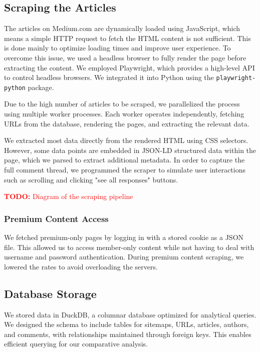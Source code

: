 \documentclass[11pt,a4paper]{article}
\newcommand{\todo}[1]{\textcolor{red}{\textbf{TODO:} #1}}
\newcommand{\code}[1]{\texttt{#1}}
\begin{document}
\subsection{Scraping the Articles}

The articles on Medium.com are dynamically loaded using JavaScript, which means a simple HTTP request to fetch the HTML content is not sufficient. This is done mainly to optimize loading times and improve user experience. To overcome this issue, we used a headless browser to fully render the page before extracting the content. We employed Playwright, which provides a high-level API to control headless browsers. We integrated it into Python using the \code{playwright-python} package.

Due to the high number of articles to be scraped, we parallelized the process using multiple worker processes. Each worker operates independently, fetching URLs from the database, rendering the pages, and extracting the relevant data. 

We extracted most data directly from the rendered HTML using CSS selectors. However, some data points are embedded in JSON-LD structured data within the page, which we parsed to extract additional metadata. In order to capture the full comment thread, we programmed the scraper to simulate user interactions such as scrolling and clicking "see all responses" buttons. 

\todo{Diagram of the scraping pipeline}

\subsubsection*{Premium Content Access}

We fetched premium-only pages by logging in with a stored cookie as a JSON file. This allowed us to access member-only content while not having to deal with username and password authentication. During premium content scraping, we lowered the rates to avoid overloading the servers.

\subsection{Database Storage}

We stored data in DuckDB, a columnar database optimized for analytical queries. We designed the schema to include tables for sitemaps, URLs, articles, authors, and comments, with relationships maintained through foreign keys. This enables efficient querying for our comparative analysis.
\end{document}

